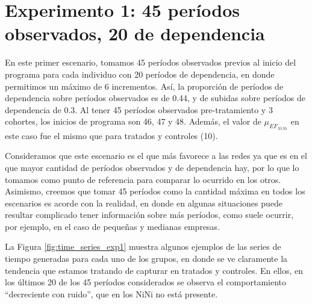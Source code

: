 \documentclass[../../main.tex]{subfiles}
\begin{document}
\section{Experimento 1: 45 períodos observados, 20 de dependencia} \label{sec:exp1}
En este primer escenario, tomamos 45 períodos observados previos al inicio del programa
para cada individuo con 20 períodos de dependencia, en donde permitimos un máximo de 6
incrementos. Así, la proporción de períodos de dependencia sobre períodos observados es de
0.44, y de subidas sobre períodos de dependencia de 0.3. Al tener 45 períodos observados
pre-tratamiento y 3 cohortes, los inicios de programa son 46, 47 y 48. Además, el valor
de \(\mu_{{EF}_{NiNi}}\) en este caso fue el mismo que para tratados y controles (10).

Consideramos que este escenario es el que más favorece a las redes ya que es en el que
mayor cantidad de períodos observados y de dependencia hay, por lo que lo tomamos como
punto de referencia para comparar lo ocurrido en los otros. Asimismo, creemos que tomar 45
períodos como la cantidad máxima en todos los escenarios es acorde con la realidad, en
donde en algunas situaciones puede resultar complicado tener información sobre más
períodos, como suele ocurrir, por ejemplo, en el caso de pequeñas y medianas empresas.

La Figura \ref{fig:time_series_exp1} muestra algunos ejemplos de las series de tiempo
generadas para cada uno de los grupos, en donde se ve claramente la tendencia que estamos
tratando de capturar en tratados y controles. En ellos, en los últimos 20 de los 45
períodos considerados se observa el comportamiento ``decreciente con ruido'', que en los
NiNi no está presente.
\end{document}

